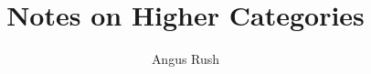 \documentclass[nohyper,nobib,nofonts]{stern-book}
\title{Notes on Higher Categories}
\author{Angus Rush}
\begin{document}
	\maketitlepage
	\setcounter{tocdepth}{1}
	\tableofcontents
	
	
	
	
	
	
	
	
	
	\begin{appendices}
	  
	\end{appendices}
	
\end{document}

